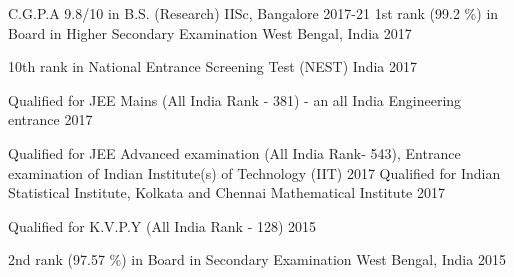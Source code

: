 




\begin{cvhonors}

  \cvhonor
{C.G.P.A} %
{9.8/10 in B.S. (Research)} %
{IISc, Bangalore} %
{2017-21} %
  \cvhonor
    {1st rank (99.2 \%) in Board} %
    {in Higher Secondary Examination} %
    {West Bengal, India} %
    {2017} %

  \cvhonor
    {} %
    {10th rank in National Entrance Screening Test (NEST)} %
    {India} %
    {2017} %

  \cvhonor
	{} %
	{Qualified for JEE Mains (All India Rank - 381) - an all India Engineering entrance} %
	{} %
	{2017} %
	 
	\cvhonor
	{} %
	{Qualified for JEE Advanced examination (All India Rank- 543), Entrance examination of Indian Institute(s) of Technology (IIT)} %
	{} %
	{2017} %
  \cvhonor
    {} %
    {Qualified for Indian Statistical Institute, Kolkata and Chennai Mathematical Institute} %
    {} %
    {2017} %

  \cvhonor
    {} %
    {Qualified for K.V.P.Y (All India Rank - 128)} %
    {} %
    {2015} %

  \cvhonor
    {2nd rank (97.57 \%) in Board} %
    {in Secondary Examination} %
    {West Bengal, India} %
    {2015} %
    \\\\

\end{cvhonors}

